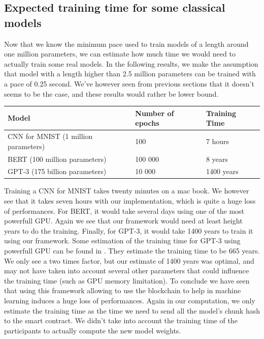 \documentclass{article}
\begin{document}
\subsection{Expected training time for some classical models}
Now that we know the minimum pace used to train models of a length around one million parameters, we can estimate
how much time we would need to actually train some real models. In the following results, we make the
assumption that model with a length higher than 2.5 million parameters can be trained with a pace of 0.25 second. We've
however seen from previous sections that it doesn't seems to be the case, and these results would rather be lower bound.
\begin{longtable}{|l|l|l|}
    \hline
    Model                                & Number of epochs & Training Time \\ \hline
    \endfirsthead
    \endhead
    CNN for MNIST (1 million parameters) & 100              & 7 hours       \\ \hline
    BERT (100 million parameters)        & 100 000          & 8 years       \\ \hline
    GPT-3 (175 billion parameters)       & 10 000           & 1400 years    \\ \hline
\end{longtable}
Training a CNN for MNIST takes twenty minutes\cite{MNIST_runtime} on a mac book. We however see that it takes seven hours
with our implementation, which is quite a huge loss of performances. For BERT, it would take several days \cite{BERT_runtime} using one of the
most powerfull GPU. Again we see that our framework would need at least height years to do the training. Finally, for GPT-3,
it would take 1400 years to train it using our framework. Some estimation of the training time for GPT-3 using powerfull
GPU can be found in \cite{GPT_runtime}. They estimate the training time to be 665 years. We only see a two times
factor, but our estimate of 1400 years was optimal, and may not have taken into account several other parameters that could influence
the training time (such as GPU memory limitation). To conclude we have seen that using this framework allowing to use the
blockchain to help in machine learning induces a huge loss of performances. Again in our computation, we only estimate the
training time as the time we need to send all the model's chunk hash to the smart contract. We didn't take into account
the training time of the participants to actually compute the new model weights.
\newpage
\end{document}
